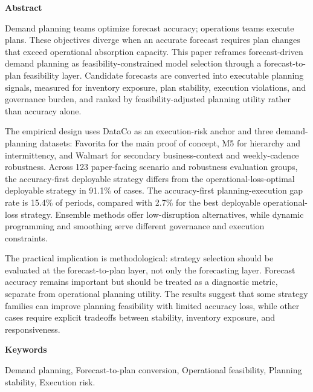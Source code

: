 \begin{center}
\textbf{Abstract}
\end{center}

Demand planning teams optimize forecast accuracy; operations teams execute plans. These objectives diverge when an accurate forecast requires plan changes that exceed operational absorption capacity. This paper reframes forecast-driven demand planning as feasibility-constrained model selection through a forecast-to-plan feasibility layer. Candidate forecasts are converted into executable planning signals, measured for inventory exposure, plan stability, execution violations, and governance burden, and ranked by feasibility-adjusted planning utility rather than accuracy alone.

The empirical design uses DataCo as an execution-risk anchor and three demand-planning datasets: Favorita for the main proof of concept, M5 for hierarchy and intermittency, and Walmart for secondary business-context and weekly-cadence robustness. Across 123 paper-facing scenario and robustness evaluation groups, the accuracy-first deployable strategy differs from the operational-loss-optimal deployable strategy in 91.1\% of cases. The accuracy-first planning-execution gap rate is 15.4\% of periods, compared with 2.7\% for the best deployable operational-loss strategy. Ensemble methods offer low-disruption alternatives, while dynamic programming and smoothing serve different governance and execution constraints.

The practical implication is methodological: strategy selection should be evaluated at the forecast-to-plan layer, not only the forecasting layer. Forecast accuracy remains important but should be treated as a diagnostic metric, separate from operational planning utility. The results suggest that some strategy families can improve planning feasibility with limited accuracy loss, while other cases require explicit tradeoffs between stability, inventory exposure, and responsiveness.

\begin{center}
\textbf{Keywords}
\end{center}

Demand planning, Forecast-to-plan conversion, Operational feasibility, Planning stability, Execution risk.
